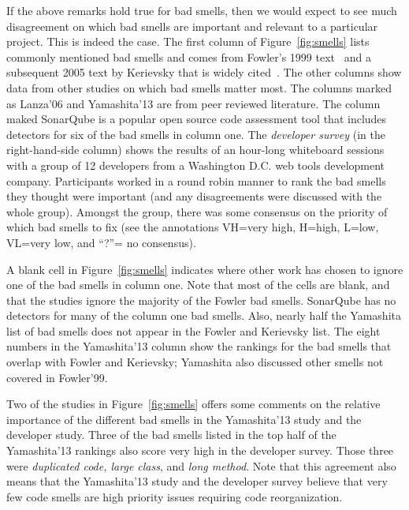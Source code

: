 \documentclass[twocolumn,5p]{elsarticle}
\newcommand{\fig}[1]{Figure~\ref{fig:#1}}
\theoremstyle{break}
\begin{document}
	
	
	
	
	If the above remarks hold true for bad smells, then we would expect
	to see much disagreement on which bad smells are important and relevant
	to  a particular project. This is indeed the case.
	The first column of \fig{smells} 
	lists  commonly mentioned bad smells and comes from Fowler's 1999 text~\cite{fowler99} and a subsequent 2005 text by Kerievsky that is widely cited~\cite{Kerievsky2005}.
	The other
	columns show data from other studies on which bad smells matter most.
	The columns marked as Lanza'06 and Yamashita'13 are from peer reviewed literature. The column maked SonarQube is a popular open source
	code assessment tool that includes detectors for six of the bad smells
	in column one. 
	The {\em developer survey} (in the right-hand-side column) shows the results of an hour-long whiteboard sessions with a group of 12 developers from a Washington
	D.C. web tools development company. Participants
	worked in a round robin manner to rank the bad smells they thought were
	important (and any disagreements were discussed with the whole group).
	Amongst the group, there was  some
	consensus on  the priority of which bad smells to fix
	(see the annotations VH=very high,
	H=high, L=low, VL=very low, and ``?''= no consensus).  
	
	
	
	
	
	A  blank cell in \fig{smells}
	indicates where   other work has chosen to ignore
	one of the bad smells in column one. 
	Note that most of the cells are blank, and that the studies ignore the majority of the Fowler bad smells.
	SonarQube has no detectors for many of the column one bad smells.
	Also, nearly half the Yamashita list of bad smells
	does not appear in the Fowler and Kerievsky list. The eight numbers
	in the  Yamashita'13 column show the rankings for the bad smells 
	that overlap with Fowler and Kerievsky; Yamashita also discussed other smells not covered in Fowler'99.
	
	
	Two of the studies in \fig{smells} offers some comments on the relative importance
	of the different bad smells in the Yamashita'13 study and the developer study. Three of the bad smells listed in the top half of the Yamashita'13 rankings also score very high in the developer survey. Those three were {\em duplicated code, large class}, 
	and {\em long method}. 
	Note that this agreement also means that the
	Yamashita'13 study and the developer survey   
	believe
	that very few  code smells are   high priority issues
	requiring code reorganization. 
	
\end{document}

